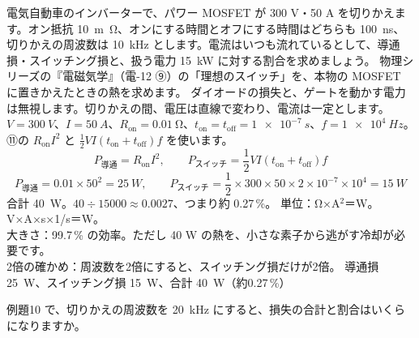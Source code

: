 \label{ph:原-10:ex10}
\begin{phreidai}
電気自動車のインバーターで、パワー MOSFET が 300 V・50 A を切りかえます。オン抵抗 \qty{10}{m\ohm}、オンにする時間とオフにする時間はどちらも \qty{100}{ns}、切りかえの周波数は \qty{10}{kHz} とします。電流はいつも流れているとして、導通損・スイッチング損と、扱う電力 \qty{15}{kW} に対する割合を求めましょう。
\phbamen
物理シリーズの『電磁気学』（電-12 ⑨）の「理想のスイッチ」を、本物の MOSFET に置きかえたときの熱を求めます。
\phmushi
ダイオードの損失と、ゲートを動かす電力は無視します。切りかえの間、電圧は直線で変わり、電流は一定とします。
\phzu
$V=\qty{300}{V}$、$I=\qty{50}{A}$、$R_{\mathrm{on}}=\qty{0.01}{\ohm}$、$t_{\mathrm{on}}=t_{\mathrm{off}}=\qty{1e-7}{s}$、$f=\qty{1e4}{Hz}$。
\phriyu
⑪の $R_{\mathrm{on}}I^2$ と $\tfrac12VI(t_{\mathrm{on}}+t_{\mathrm{off}})f$ を使います。
\phtateru
\[ P_{\text{導通}}=R_{\mathrm{on}}I^2,\qquad P_{\text{スイッチ}}=\frac12VI(t_{\mathrm{on}}+t_{\mathrm{off}})f \]
\phtoku
\[ P_{\text{導通}}=0.01\times50^2=\qty{25}{W},\qquad P_{\text{スイッチ}}=\frac12\times300\times50\times2\times10^{-7}\times10^4=\qty{15}{W} \]
合計 \qty{40}{W}。$40\div15000\approx0.0027$、つまり約 0.27\,\%。
\phtashikame
単位：Ω×A$^2$＝W。V×A×s×1/s＝W。\\
大きさ：99.7\,\% の効率。ただし 40 W の熱を、小さな素子から逃がす冷却が必要です。\\
2倍の確かめ：周波数を2倍にすると、スイッチング損だけが2倍。
\kotae 導通損 \qty{25}{W}、スイッチング損 \qty{15}{W}、合計 \qty{40}{W}（約0.27\,\%）
\end{phreidai}
\begin{jibun}
例題10 で、切りかえの周波数を \qty{20}{kHz} にすると、損失の合計と割合はいくらになりますか。
\end{jibun}


